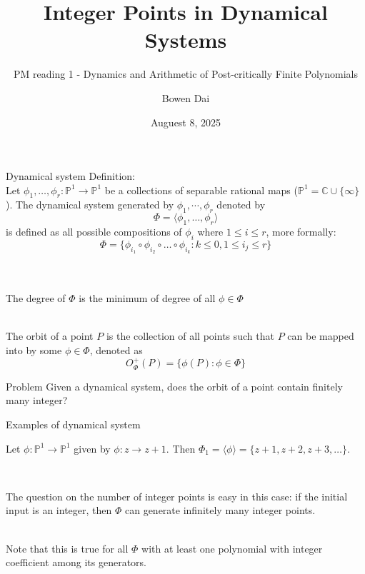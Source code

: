 \documentclass[aspectratio=169,xcolor=dvipsnames]{beamer}
\title{Integer Points in Dynamical Systems}
\subtitle{PM reading 1 - Dynamics and Arithmetic of Post-critically Finite Polynomials}
\author{Bowen Dai}
\institute
{
    Mentor: Xiao Zhong
}
\date{Auguest 8, 2025} %
\begin{document}
\begin{frame}
    \titlepage
\end{frame}


\begin{frame}{Dynamical system}
    Definition:\\
    Let $\phi_1, \dots,\phi_r:\mathbb{P}^1\to \mathbb{P}^1$ be a collections of separable rational maps ($\mathbb{P}^1 = \mathbb{C}\cup\{\infty\}$). The dynamical system generated by $\phi_1,\cdots,\phi_r$ denoted by 
    $$\Phi = \langle\phi_1,\dots,\phi_r\rangle$$
    is defined as all possible compositions of $\phi_i$ where $1\leq i \leq r$, more formally:
    $$\Phi = \{\phi_{i_1}\circ \phi_{i_2}\circ\dots\circ\phi_{i_k}:k\leq0, 1\leq i_j\leq r\}$$\pause\\~
    
    The degree of $\Phi$ is the minimum of degree of all $\phi\in \Phi$\pause\\~
    
    The orbit of a point $P$ is the collection of all points such that $P$ can be mapped into by some $\phi\in\Phi$, denoted as 
    $$O_\Phi^+(P) = \{\phi(P):\phi\in\Phi\}$$
\end{frame}


\begin{frame}{Problem}
    Given a dynamical system, does the orbit of a point contain finitely many integer?
\end{frame}


\begin{frame}{Examples of dynamical system}
    \begin{examples}
        Let $\phi:\mathbb{P}^1\to \mathbb{P}^1$ given by $\phi:z\to z+1$. Then $\Phi_1 = \langle\phi\rangle = \{z+1, z+2, z+3, \dots\}$.    
    \end{examples}\pause
    ~
    
    The question on the number of integer points is easy in this case: if the initial input is an integer, then $\Phi$ can generate infinitely many integer points.\pause \\~
    
    Note that this is true for all $\Phi$ with at least one polynomial with integer coefficient among its generators.
\end{frame}
\end{document}
